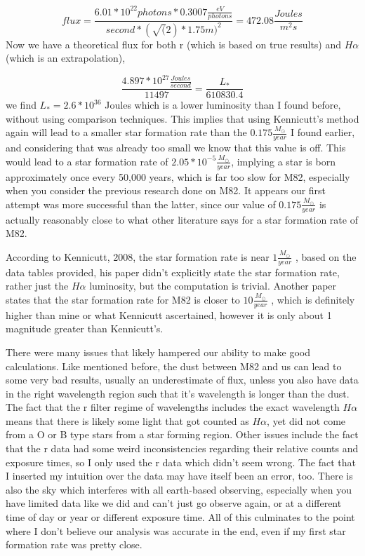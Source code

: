 \documentclass[modern]{aastex63}
\begin{document}
\begin{equation}
flux = \frac{6.01 * 10^{22} photons * 0.3007 \frac{eV}{photons}}{second * (\sqrt(2)*1.75 m)^{2}} = 472.08 \frac{Joules}{m^2s}
\end{equation}
Now we have a theoretical flux for both r (which is based on true results) and $H\alpha$ (which is an extrapolation),

\begin{equation}
\frac{4.897 * 10^{27}\frac{Joules}{second}} {11497} = \frac{L_*}{610830.4}
\end{equation} we find $L_* = 2.6 * 10^{36}$ Joules which is a lower luminosity than I found before, without using comparison techniques. This implies that using Kennicutt's method again will lead to a smaller star formation rate than the $0.175 \frac{M_{\odot}}{year}$ I found earlier, and considering that was already too small we know that this value is off. This would lead to a star formation rate of $2.05 * 10^{-5} \frac{M_{\odot}}{year}$, implying a star is born approximately once every 50,000 years, which is far too slow for M82, especially when you consider the previous research done on M82. It appears our first attempt was more successful than the latter, since our value of $0.175 \frac{M_{\odot}}{year}$ is actually reasonably close to what other literature says for a star formation rate of M82.

According to Kennicutt, 2008, the star formation rate is near $1 \frac{M_{\odot}}{year}$ \citep{2008ApJS..178..247K}, based on the data tables provided, his paper didn't explicitly state the star formation rate, rather just the $H\alpha$ luminosity, but the computation is trivial. Another paper states that the star formation rate for M82 is closer to $10 \frac{M_{\odot}}{year}$ \citep{2001A&G....42d..12D}, which is definitely higher than mine or what Kennicutt ascertained, however it is only about 1 magnitude greater than Kennicutt's.

There were many issues that likely hampered our ability to make good calculations. Like mentioned before, the dust between M82 and us can lead to some very bad results, usually an underestimate of flux, unless you also have data in the right wavelength region such that it's wavelength is longer than the dust. The fact that the r filter regime of wavelengths includes the exact wavelength $H\alpha$ means that there is likely some light that got counted as $H\alpha$, yet did not come from a O or B type stars from a star forming region. Other issues include the fact that the r data had some weird inconsistencies regarding their relative counts and exposure times, so I only used the r data which didn't seem wrong. The fact that I inserted my intuition over the data may have itself been an error, too. There is also the sky which interferes with all earth-based observing, especially when you have limited data like we did and can't just go observe again, or at a different time of day or year or different exposure time. All of this culminates to the point where I don't believe our analysis was accurate in the end, even if my first star formation rate was pretty close.
\end{document}
